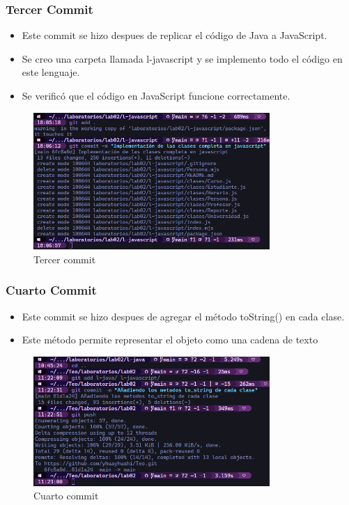 \subsubsection {Tercer Commit}

\begin{itemize}
    \item Este commit se hizo despues de replicar el código de Java a JavaScript.
    \item Se creo una carpeta llamada l-javascript y se implemento todo el código en este lenguaje.
    \item Se verificó que el código en JavaScript funcione correctamente.
\end{itemize}

\begin{figure}[H]
    \centering
    \includegraphics[width=0.8\textwidth]{img/commit03.png}
    \caption{Tercer commit}
\end{figure}


\subsubsection {Cuarto Commit}

\begin{itemize}
    \item Este commit se hizo despues de agregar el método toString() en cada clase.
    \item Este método permite representar el objeto como una cadena de texto
\end{itemize}

\begin{figure}[H]
    \centering
    \includegraphics[width=0.8\textwidth]{img/commit04.png}
    \caption{Cuarto commit}
\end{figure}

